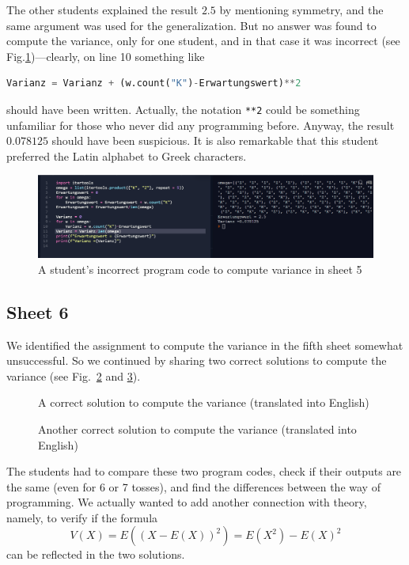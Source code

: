 \documentclass[]{interact}
\theoremstyle{plain}%
\theoremstyle{definition}
\theoremstyle{remark}
\begin{document}
The other students explained the result $2.5$ by mentioning symmetry, and the same argument was
used for the generalization. But no answer was found to compute the variance, only for one student,
and in that case it was incorrect (see Fig.\ref{52})---clearly, on line 10 something like
\begin{lstlisting}[language=Python,firstnumber=10]
  Varianz = Varianz + (w.count("K")-Erwartungswert)**2
\end{lstlisting}
should have been written. Actually, the notation \texttt{**2} could be something unfamiliar
for those who never did any programming before. Anyway, the result $0.078125$ should have been
suspicious. It is also remarkable that this student preferred the Latin alphabet to Greek characters.
\begin{figure}
\begin{center}\includegraphics[width=1.0\textwidth]{52}
\caption{A student's incorrect program code to compute variance in sheet 5}
\label{52}
\end{center}
\end{figure}

\subsection*{Sheet 6}

We identified the assignment to compute the variance in the fifth sheet somewhat unsuccessful.
So we continued by sharing two correct solutions to compute the variance (see Fig.~\ref{6a.py}
and \ref{6b.py}).

\begin{figure}

\caption{A correct solution to compute the variance (translated into English)}
\label{6a.py}
\end{figure}

\begin{figure}

\caption{Another correct solution to compute the variance (translated into English)}
\label{6b.py}
\end{figure}

The students had to compare these two program codes, check if their outputs are the same
(even for 6 or 7 tosses), and find the differences between the way of programming.
We actually wanted to add another connection with theory, namely, to verify if the
formula
\begin{equation}
V(X)=E((X-E(X))^2)=E(X^2)-E(X)^2
\label{variance}
\end{equation}
can be reflected in the two solutions.
\end{document}
